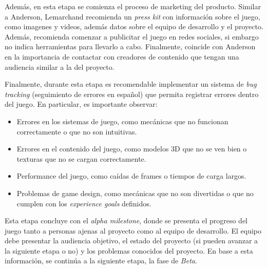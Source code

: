 \par Además, en esta etapa se comienza el proceso de marketing del producto. Similar a Anderson, Lemarchand recomienda un \textit{press kit} con información sobre el juego, como imagenes y videos, además datos sobre el equipo de desarrollo y el proyecto. Además, recomienda comenzar a publicitar el juego en redes sociales, si embargo no indica herramientas para llevarlo a cabo. Finalmente, coincide con Anderson en la importancia de contactar con creadores de contenido que tengan una audiencia similar a la del proyecto.
\par Finalmente, durante esta etapa es recomendable implementar un sistema de \textit{bug tracking} (seguimiento de errores en español) que permita registrar errores dentro del juego. En particular, es importante observar:
\begin{itemize}
    \item Errores en los sistemas de juego, como mecánicas que no funcionan correctamente o que no son intuitivas.
    \item Errores en el contenido del juego, como modelos 3D que no se ven bien o texturas que no se cargan correctamente.
    \item Performance del juego, como caídas de frames o tiempos de carga largos.
    \item Problemas de game design, como mecánicas que no son divertidas o que no cumplen con los \textit{experience goals} definidos.
\end{itemize}
\bigbreak
\par Esta etapa concluye con el \textit{alpha milestone}, donde se presenta el progreso del juego tanto a personas ajenas al proyecto como al equipo de desarrollo. El equipo debe presentar la audiencia objetivo, el estado del proyecto (si pueden avanzar a la siguiente etapa o no) y los problemas conocidos del proyecto. En base a esta información, se continúa a la siguiente etapa, la fase de \textit{Beta}.
%
%
